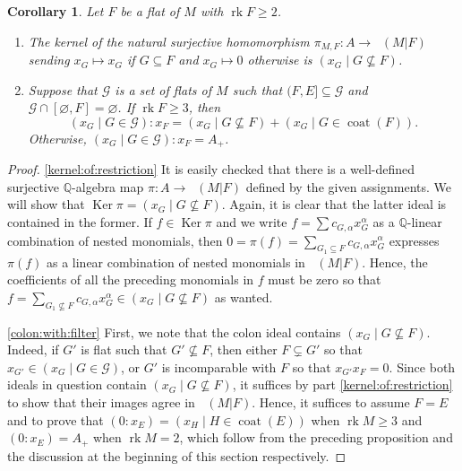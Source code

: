\documentclass[11pt, reqno]{amsart}
\DeclareMathOperator{\Chow}{\underline{CH}}		%
\DeclareMathOperator{\coat}{coat}
\renewcommand{\emptyset}{\varnothing}
\DeclareMathOperator{\Ker}{Ker}
\renewcommand{\ker}{\Ker}
\newcommand{\QQ}{\mathbb{Q}}
\DeclareMathOperator{\rk}{rk}
\newtheorem{cor}[thm]{Corollary}
\theoremstyle{definition}
\numberwithin{equation}{section}
\numberwithin{table}{section}
\begin{document}
\begin{spacing}{1.1}
\begin{cor} \label{colons:of:arbitrary:flats}
Let $F$ be a flat of $M$ with $\rk F \geq 2$.
\begin{enumerate}[label = \textnormal{(\alph*)}]
\item \label{kernel:of:restriction} The kernel of the natural surjective homomorphism $\pi_{M,F}: A \to \Chow(M \vert F)$ sending $x_G \mapsto x_G$ if $G \subseteq F$ and $x_G \mapsto 0$ otherwise is $(x_G \mid G \nsubseteq F)$.
\item \label{colon:with:filter} Suppose that $\mathcal{G}$ is a set of flats of $M$ such that $(F, E] \subseteq \mathcal{G}$ and $\mathcal{G} \cap [\emptyset, F] = \emptyset$. If $\rk F \geq 3$, then
\[ 
(x_G \mid G \in \mathcal{G}) : x_F = (x_G \mid G \nsubseteq F) + (x_G \mid G \in \coat(F)). 
\]
Otherwise, $(x_G \mid G \in \mathcal{G}) : x_F = A_+$.
\end{enumerate}
\end{cor}

\begin{proof}
\ref{kernel:of:restriction}  It is easily checked that there is a well-defined surjective $\QQ$-algebra map $\pi: A \to \Chow(M\vert F)$ defined by the given assignments.  We will show that $\ker \pi = (x_G \mid G \nsubseteq F)$.  Again, it is clear that the latter ideal is contained in the former.  If $f \in \ker \pi$ and we write $f = \sum c_{G, \alpha} x_G^\alpha$ as a $\QQ$-linear combination of nested monomials, then $0 = \pi(f) = \sum_{G_1 \subseteq F} c_{G, \alpha} x_G^\alpha$ expresses $\pi(f)$ as a linear combination of nested monomials in $\Chow(M\vert F)$.  Hence, the coefficients of all the preceding monomials in $f$ must be zero so that $f = \sum_{G_1 \nsubseteq F} c_{G, \alpha} x_G^\alpha \in (x_G \mid G \nsubseteq F)$ as wanted. 

\ref{colon:with:filter}  First, we note that the colon ideal contains $(x_G \mid G \nsubseteq F)$.  Indeed, if $G'$ is flat such that $G' \nsubseteq F$, then either $F \subsetneq G'$ so that $x_{G'} \in (x_G \mid G \in \mathcal{G})$, or $G'$ is incomparable with $F$ so that $x_{G'}x_F = 0$.  Since both ideals in question contain $(x_G \mid G \nsubseteq F)$, it suffices by part \ref{kernel:of:restriction} to show that their images agree in $\Chow(M\vert F)$.  Hence, it suffices to assume $F = E$ and to prove that $(0 : x_E) = (x_H \mid H \in \coat(E))$ when $\rk M \geq 3$ and $(0 : x_E) = A_+$ when $\rk M = 2$, which follow from the preceding proposition and the discussion at the beginning of this section respectively.
\end{proof}


\end{spacing}
\end{document}

